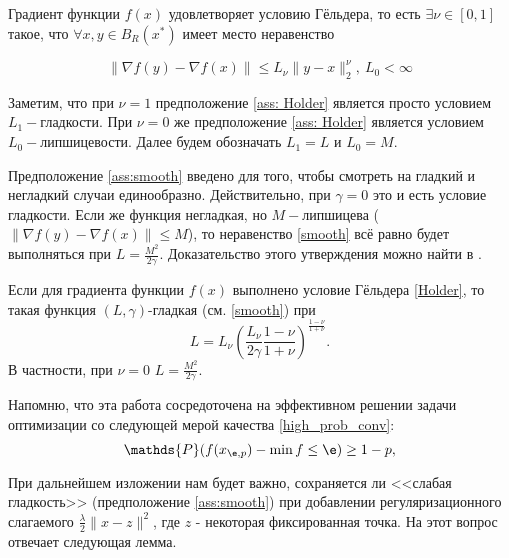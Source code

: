 \begin{assumption} \label{ass: Holder}
    Градиент функции $f(x)$ удовлетворяет условию Гёльдера, то есть $\exists \nu \in [0, 1]$ такое, что $\forall x, y \in B_{R} (x^*) $ имеет место неравенство

    \begin{equation} \label{Holder}
        \|\nabla f(y) - \nabla f(x)\| \le L_{\nu} \|y - x\|_2^{\nu}, \ L_0 < \infty
    \end{equation}   
\end{assumption}

Заметим, что при $\nu = 1$ предположение \ref{ass: Holder} является просто условием $L_1-$гладкости. При $\nu = 0$ же предположение \ref{ass: Holder} является условием $L_0-$липшицевости. Далее будем обозначать $L_1 = L$ и $L_0 = M$.

Предположение \eqref{ass:smooth} введено для того, чтобы  смотреть на гладкий и негладкий случаи единообразно. Действительно, при $\gamma = 0$ это и есть условие гладкости. Если же функция негладкая, но $M-$липшицева ($\|\nabla f(y) - \nabla f(x)\| \le M$), то неравенство \eqref{smooth} всё равно будет выполняться при $L = \frac{M^2}{2\gamma}$. Доказательство этого утверждения можно найти в \cite{nesterov2015universal}.

\begin{lemma} \label{lemma:nesterov}
    Если для градиента функции $f(x)$ выполнено условие Гёльдера \eqref{Holder}, то такая функция $(L, \gamma)$-гладкая (см. \eqref{smooth}) при $$L = L_{\nu} \left(\frac{L_{\nu}}{2 \gamma} \frac{1-\nu}{1+\nu}\right) ^{\frac{1-\nu}{1+\nu}}.$$
    В частности, при $\nu = 0$ $L = \frac{M^2}{2\gamma}$.
\end{lemma}

Напомню, что эта работа сосредоточена на эффективном решении задачи оптимизации со следующей мерой качества \eqref{high_prob_conv}:
\begin{equation*} 
   \mathds{P} (f(x_{\e, p})-\min f \le \e) \ge 1 - p,  
\end{equation*}

При дальнейшем изложении нам будет важно, сохраняется ли <<слабая гладкость>> (предположение \ref{ass:smooth}) при добавлении регуляризационного слагаемого $\frac{\lambda}{2} \|x - z\|^2$, где $z$ - некоторая фиксированная точка. На этот вопрос отвечает следующая лемма.

